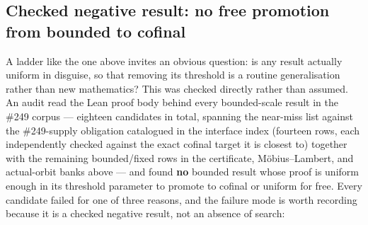\subsection{Checked negative result: no free promotion from bounded to cofinal}

A ladder like the one above invites an obvious question: is any  result actually
uniform in disguise, so that removing its threshold is a routine generalisation rather than new
mathematics? This was checked directly rather than assumed. An audit read the Lean proof body
behind every bounded-scale result in the \#249 corpus — eighteen candidates in total, spanning
the near-miss list against the \#249-supply obligation catalogued in the interface index (fourteen
rows, each independently checked against the exact cofinal target it is closest to) together with
the remaining bounded/fixed rows in the certificate, M\"obius--Lambert, and actual-orbit banks
above — and found \textbf{no} bounded result whose proof is uniform enough in its threshold
parameter to promote to cofinal or uniform for free. Every candidate failed for one of three
reasons, and the failure mode is worth recording because it is a checked negative result, not an
absence of search:

